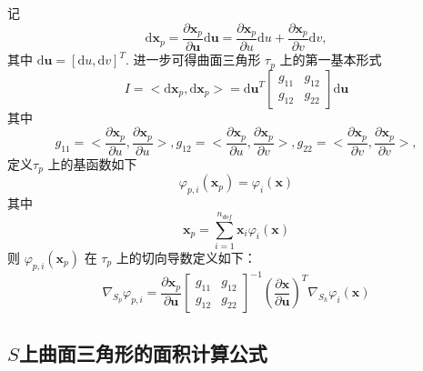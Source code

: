 \documentclass{article}
\begin{document}
记
\begin{equation*} 
\mathrm d \mathbf x_p = \frac{\partial \mathbf x_p}{\partial \mathbf u}\mathrm d \mathbf u = \frac{\partial \mathbf x_p}{\partial u}\mathrm d u + \frac{\partial \mathbf x_p}{\partial v}\mathrm d v,
\end{equation*}
其中 $\mathrm d \mathbf u = [\mathrm d u, \mathrm d v]^T$.
进一步可得曲面三角形 $\tau_p$ 上的第一基本形式
\begin{equation*}
I = <\mathrm d \mathbf x_p, \mathrm d \mathbf x_p> = \mathrm d \mathbf u^T 
\begin{bmatrix}
g_{11} & g_{12}\\
g_{12} & g_{22}
\end{bmatrix}
\mathrm d \mathbf u
\end{equation*}
其中 
\begin{equation*}
g_{11} =<\frac{\partial \mathbf x_p}{\partial u}, \frac{\partial \mathbf x_p}{\partial u}>, 
g_{12} =<\frac{\partial \mathbf x_p}{\partial u}, \frac{\partial \mathbf x_p}{\partial v}>, 
g_{22} =<\frac{\partial \mathbf x_p}{\partial v}, \frac{\partial \mathbf x_p}{\partial v}>, 
\end{equation*}
定义$\tau_p$ 上的基函数如下
\begin{equation*}
\varphi_{p,i}(\mathbf x_p) =\varphi_i(\mathbf x) 
\end{equation*}
其中
\begin{equation*}
\mathbf x_p = \sum_{i=1}^{n_{dof}} \mathbf x_i \varphi_i(\mathbf x)
\end{equation*}
则 $\varphi_{p,i}(\mathbf x_p)$ 在 $\tau_p$ 上的切向导数定义如下：
\begin{equation*}
\nabla_{S_p} \varphi_{p,i} = \frac{\partial \mathbf x_p}{\partial \mathbf u}\begin{bmatrix}
g_{11} & g_{12}\\
g_{12} & g_{22}
\end{bmatrix}^{-1}(\frac{\partial \mathbf x}{\partial \mathbf u})^T\nabla_{S_h}\varphi_i(\mathbf x)
\end{equation*}

\subsection{$S$上曲面三角形的面积计算公式}
\end{document}
